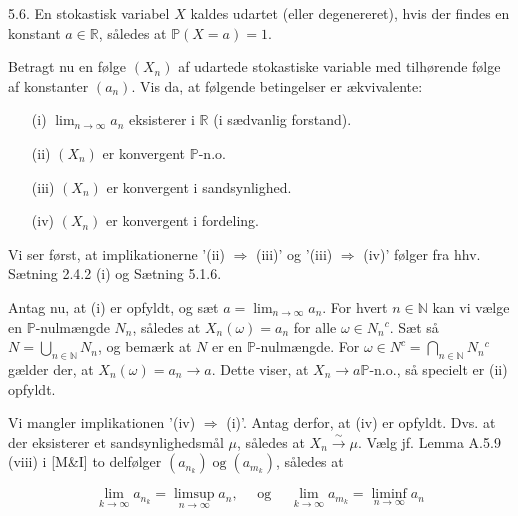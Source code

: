 \documentclass{Class}
\begin{document}
5.6. En stokastisk variabel $X$ kaldes udartet (eller degenereret), hvis der findes en konstant $a \in \mathbb{R}$, således at $\mathbb{P}(X=a)=1$.

Betragt nu en følge $\left(X_n\right)$ af udartede stokastiske variable med tilhørende følge af konstanter $\left(a_n\right)$. Vis da, at følgende betingelser er ækvivalente:
\begin{enumerate}
    \item[(i)] $\lim _{n \rightarrow \infty} a_n$ eksisterer i $\mathbb{R}$ (i sædvanlig forstand).
    \item[(ii)] $\left(X_n\right)$ er konvergent $\mathbb{P}$-n.o.
    \item[(iii)] $\left(X_n\right)$ er konvergent i sandsynlighed.
    \item[(iv)] $\left(X_n\right)$ er konvergent i fordeling.
\end{enumerate}
\solution
Vi ser først, at implikationerne '(ii) $\Rightarrow$ (iii)' og '(iii) $\Rightarrow$ (iv)' følger fra hhv. Sætning 2.4.2 (i) og Sætning 5.1.6.

Antag nu, at (i) er opfyldt, og sæt $a=\lim _{n \rightarrow \infty} a_n$. For hvert $n \in \mathbb{N}$ kan vi vælge en $\mathbb{P}$-nulmængde $N_n$, således at $X_n(\omega)=a_n$ for alle $\omega \in N_n{ }^c$. Sæt så $N=\bigcup_{n \in \mathbb{N}} N_n$, og bemærk at $N$ er en $\mathbb{P}$-nulmængde. For $\omega \in N^c=\bigcap_{n \in \mathbb{N}} N_n{ }^c$ gælder der, at $X_n(\omega)=a_n \rightarrow a$. Dette viser, at $X_n \rightarrow a \mathbb{P}$-n.o., så specielt er (ii) opfyldt.

Vi mangler implikationen '(iv) $\Rightarrow$ (i)'. Antag derfor, at (iv) er opfyldt. Dvs. at der eksisterer et sandsynlighedsmål $\mu$, således at $X_n \xrightarrow{\sim} \mu$. Vælg jf. Lemma A.5.9 (viii) i [M\&I] to delfølger $\left(a_{n_k}\right) \operatorname{og}\left(a_{m_k}\right)$, således at

$$
\lim _{k \rightarrow \infty} a_{n_k}=\limsup _{n \rightarrow \infty} a_n, \quad \text { og } \quad \lim _{k \rightarrow \infty} a_{m_k}=\liminf _{n \rightarrow \infty} a_n
$$
\end{document}

